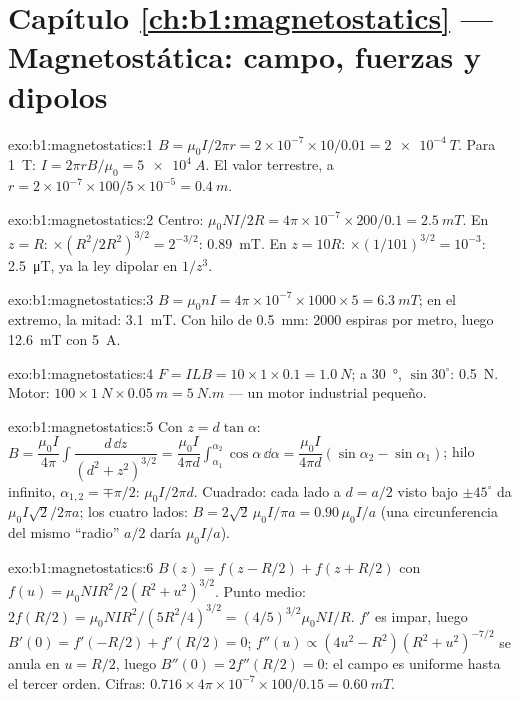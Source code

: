 \section*{Capítulo \ref{ch:b1:magnetostatics} --- Magnetostática: campo, fuerzas y dipolos}

\begin{solution}{exo:b1:magnetostatics:1}
$B = \mu_0I/2\pi r = 2 \times 10^{-7} \times 10/0.01 = \qty{2e-4}{T}$. Para \qty{1}{T}:
$I = 2\pi rB/\mu_0 = \qty{5e4}{A}$. El valor terrestre, a $r = 2 \times 10^{-7} \times
100/5 \times 10^{-5} = \qty{0.4}{m}$.
\end{solution}

\begin{solution}{exo:b1:magnetostatics:2}
Centro: $\mu_0NI/2R = 4\pi \times 10^{-7} \times 200/0.1 = \qty{2.5}{mT}$. En $z = R$:
$\times(R^2/2R^2)^{3/2} = 2^{-3/2}$: \qty{0.89}{mT}. En $z = 10R$: $\times(1/101)^{3/2}
= 10^{-3}$: \qty{2.5}{\micro T}, ya la ley dipolar en $1/z^3$.
\end{solution}

\begin{solution}{exo:b1:magnetostatics:3}
$B = \mu_0nI = 4\pi \times 10^{-7} \times 1000 \times 5 = \qty{6.3}{mT}$; en el extremo,
la mitad: \qty{3.1}{mT}. Con hilo de \qty{0.5}{mm}: $2000$ espiras por metro, luego
\qty{12.6}{mT} con \qty{5}{A}.
\end{solution}

\begin{solution}{exo:b1:magnetostatics:4}
$F = ILB = 10 \times 1 \times 0.1 = \qty{1.0}{N}$; a \qty{30}{\degree}, $\sin30^\circ$:
\qty{0.5}{N}. Motor: $100 \times \qty{1}{N} \times \qty{0.05}{m} = \qty{5}{N.m}$ ---
un motor industrial pequeño.
\end{solution}

\begin{solution}{exo:b1:magnetostatics:5}
Con $z = d\tan\alpha$: $B = \dfrac{\mu_0I}{4\pi}\displaystyle\int\dfrac{d\,\dd z}{(d^2 + z^2)^{3/2}}
= \dfrac{\mu_0I}{4\pi d}\displaystyle\int_{\alpha_1}^{\alpha_2}\cos\alpha\,\dd\alpha = \dfrac{\mu_0I}{4\pi d}
(\sin\alpha_2 - \sin\alpha_1)$; hilo infinito, $\alpha_{1,2} = \mp\pi/2$: $\mu_0I/2\pi d$.
Cuadrado: cada lado a $d = a/2$ visto bajo $\pm45^\circ$ da $\mu_0I\sqrt2/2\pi a$;
los cuatro lados: $B = 2\sqrt2\,\mu_0I/\pi a = 0.90\,\mu_0I/a$ (una circunferencia del mismo
``radio'' $a/2$ daría $\mu_0I/a$).
\end{solution}

\begin{solution}{exo:b1:magnetostatics:6}
$B(z) = f(z - R/2) + f(z + R/2)$ con $f(u) = \mu_0NIR^2/2(R^2 + u^2)^{3/2}$.
Punto medio: $2f(R/2) = \mu_0NIR^2/(5R^2/4)^{3/2} = (4/5)^{3/2}\mu_0NI/R$. $f'$ es
impar, luego $B'(0) = f'(-R/2) + f'(R/2) = 0$; $f''(u) \propto (4u^2 - R^2)(R^2 +
u^2)^{-7/2}$ se anula en $u = R/2$, luego $B''(0) = 2f''(R/2) = 0$: el campo es
uniforme hasta el tercer orden. Cifras: $0.716 \times 4\pi \times 10^{-7} \times 100/0.15 =
\qty{0.60}{mT}$.
\end{solution}

